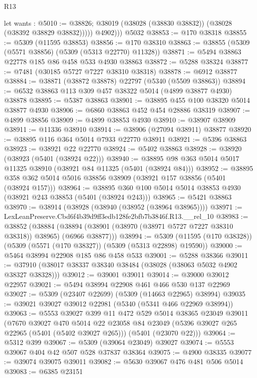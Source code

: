 \begin{lexlean}{R13}
\begin{coremodule}
            let wants : @5010 := @38826;
            @38019 (@38028 (@38830 @38832)) (@38028 (@38392 @38829 @38832)))))
          @4902)))
    @5032
@38853 := @170 @38318
@38855 := @5309 (@11595 @38853)
@38856 := @170 @38310
@38863 := @38855 (@5309 (@5571 @38856) (@5309 (@5313 @22770) @11328))
@38871 := @5494 @38863 @22778 @185 @86 @458 @533 @4930 @38863
@38872 := @5288 @38324
@38877 := @7481 (@30185 @5727 @7227 @38310 @38318)
@38878 := @6912 @38877
@38884 := @38871 (@38872 @38878) @22797 (@5340 (@5509 @38863))
@38894 := @6532 @38863 @113 @309 @457 @38322 @5014 (@4899 @38877 @4930) @38878
@38895 := @5387 @38863
@38901 := @38895 @455 @100 @38320 @5014 @38877 @4930
@38906 := @6860 @38863 @452 @454 @28886 @38319
@38907 := @4899 @38856
@38909 := @4899 @38853 @4930
@38910 := @38907 @38909
@38911 := @11336 @38910
@38914 := @38906 (@27094 @38911) @38877
@38920 := @38895 @116 @364 @5014 @7933 @22770 @38911
@38921 := @5396 @38863
@38923 := @38921 @22 @22770
@38924 := @5402 @38863
@38928 := @38920 (@38923 (@5401 (@38924 @22)))
@38940 := @38895 @98 @363 @5014 @5017 @11325 @38910 (@38921 @84 @11325 (@5401 (@38924 @84)))
@38952 := @38895 @358 @362 @5014 @5016 @38856 @38909 (@38921 @157 @38856 (@5401 (@38924 @157)))
@38964 := @38895 @360 @100 @5014 @5014 @38853 @4930 (@38921 @243 @38853 (@5401 (@38924 @243)))
@38965 := @5421 @38863
@38970 := @38914 (@38928 (@38940 (@38952 (@38964 @38965))))
@38971 := LexLeanPreserve.Cbd6f4b39d9ff3edb128fe2bfb7b3846f.R13.__rel_10
@38983 := @38852
    (@38884 (@38894 (@38901 (@38970 (@38971 @5727 @7227 @38310 @38318)) @38965) (@6966 @38877)))
@38994 := @5309 (@11595 (@170 @38328)) (@5309 (@5571 (@170 @38327)) (@5309 (@5313 @22898) @19590))
@39000 := @5464 @38994 @22908 @185 @86 @458 @533
@39001 := @5288 @38366
@39011 := @37910 (@38017 @38337 @38340 @38484 (@38028 (@38063 @5032 @4902 @38327 @38328)))
@39012 := @39001 @39011
@39014 := @39000 @39012 @22957
@39021 := @5494 @38994 @22908 @461 @466 @530 @137 @22969
@39027 := @5309 (@23407 @22699) (@5309 (@14663 @22965) @38994)
@39035 := @39021 @39027 @39012 @22981 (@5340 (@5341 @466 @22969 @38994))
@39063 := @5553
    @39027
    @399
    @11
    @472
    @529
    @5014
    @38365
    @23049
    @39011
    (@7670
      @39027
      @470
      @5014
      @22
      @23058
      @84
      @23049
      (@5396 @39027 @265 @22965 (@5401 (@5402 @39027 @265)))
      (@5401 (@23070 @22)))
@39064 := @5312 @399
@39067 := @5309 (@39064 @23049) @39027
@39074 := @5553 @39067 @404 @42 @507 @528 @37837 @38364
@39075 := @4900 @38335
@39077 := @39074 @39075 @39011
@39082 := @5630 @39067 @476 @481 @506 @5014
@39083 := @6385 @23151

\end{coremodule}
\end{lexlean}
